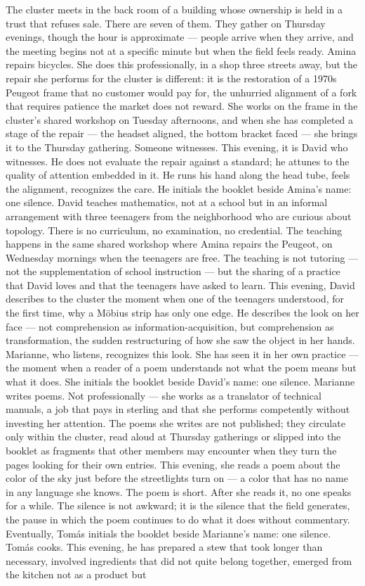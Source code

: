 The cluster meets in the back room of a building whose ownership is held in a trust that refuses sale. There are seven of them. They gather on Thursday evenings, though the hour is approximate — people arrive when they arrive, and the meeting begins not at a specific minute but when the field feels ready. Amina repairs bicycles. She does this professionally, in a shop three streets away, but the repair she performs for the cluster is different: it is the restoration of a 1970s Peugeot frame that no customer would pay for, the unhurried alignment of a fork that requires patience the market does not reward. She works on the frame in the cluster’s shared workshop on Tuesday afternoons, and when she has completed a stage of the repair — the headset aligned, the bottom bracket faced — she brings it to the Thursday gathering. Someone witnesses. This evening, it is David who witnesses. He does not evaluate the repair against a standard; he attunes to the quality of attention embedded in it. He runs his hand along the head tube, feels the alignment, recognizes the care. He initials the booklet beside Amina’s name: one silence. David teaches mathematics, not at a school but in an informal arrangement with three teenagers from the neighborhood who are curious about topology. There is no curriculum, no examination, no credential. The teaching happens in the same shared workshop where Amina repairs the Peugeot, on Wednesday mornings when the teenagers are free. The teaching is not tutoring — not the supplementation of school instruction — but the sharing of a practice that David loves and that the teenagers have asked to learn. This evening, David describes to the cluster the moment when one of the teenagers understood, for the first time, why a Möbius strip has only one edge. He describes the look on her face — not comprehension as information-acquisition, but comprehension as transformation, the sudden restructuring of how she saw the object in her hands. Marianne, who listens, recognizes this look. She has seen it in her own practice — the moment when a reader of a poem understands not what the poem means but what it does. She initials the booklet beside David’s name: one silence. Marianne writes poems. Not professionally — she works as a translator of technical manuals, a job that pays in sterling and that she performs competently without investing her attention. The poems she writes are not published; they circulate only within the cluster, read aloud at Thursday gatherings or slipped into the booklet as fragments that other members may encounter when they turn the pages looking for their own entries. This evening, she reads a poem about the color of the sky just before the streetlights turn on — a color that has no name in any language she knows. The poem is short. After she reads it, no one speaks for a while. The silence is not awkward; it is the silence that the field generates, the pause in which the poem continues to do what it does without commentary. Eventually, Tomás initials the booklet beside Marianne’s name: one silence. Tomás cooks. This evening, he has prepared a stew that took longer than necessary, involved ingredients that did not quite belong together, emerged from the kitchen not as a product but

